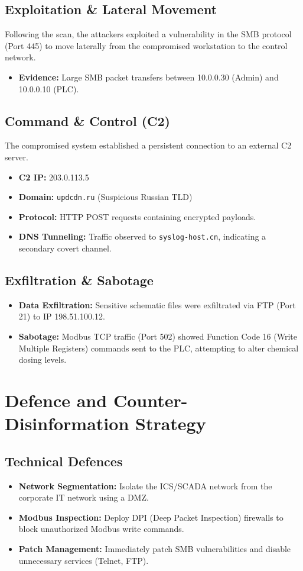 \documentclass[12pt,a4paper]{article}
\begin{document}
\subsection{Exploitation \& Lateral Movement}
Following the scan, the attackers exploited a vulnerability in the SMB protocol (Port 445) to move laterally from the compromised workstation to the control network.
\begin{itemize}
    \item \textbf{Evidence:} Large SMB packet transfers between 10.0.0.30 (Admin) and 10.0.0.10 (PLC).
\end{itemize}

\subsection{Command \& Control (C2)}
The compromised system established a persistent connection to an external C2 server.
\begin{itemize}
    \item \textbf{C2 IP:} 203.0.113.5
    \item \textbf{Domain:} \texttt{updcdn.ru} (Suspicious Russian TLD)
    \item \textbf{Protocol:} HTTP POST requests containing encrypted payloads.
    \item \textbf{DNS Tunneling:} Traffic observed to \texttt{syslog-host.cn}, indicating a secondary covert channel.
\end{itemize}

\subsection{Exfiltration \& Sabotage}
\begin{itemize}
    \item \textbf{Data Exfiltration:} Sensitive schematic files were exfiltrated via FTP (Port 21) to IP 198.51.100.12.
    \item \textbf{Sabotage:} Modbus TCP traffic (Port 502) showed Function Code 16 (Write Multiple Registers) commands sent to the PLC, attempting to alter chemical dosing levels.
\end{itemize}

\section{Defence and Counter-Disinformation Strategy}

\subsection{Technical Defences}
\begin{itemize}
    \item \textbf{Network Segmentation:} Isolate the ICS/SCADA network from the corporate IT network using a DMZ.
    \item \textbf{Modbus Inspection:} Deploy DPI (Deep Packet Inspection) firewalls to block unauthorized Modbus write commands.
    \item \textbf{Patch Management:} Immediately patch SMB vulnerabilities and disable unnecessary services (Telnet, FTP).
\end{itemize}
\end{document}
